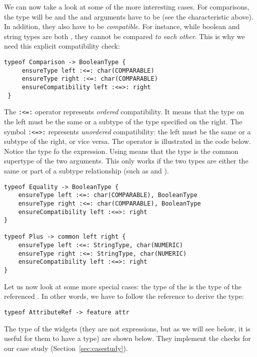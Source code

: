 We can now take a look at some of the more interesting cases. For comparisons,
the type will be  and the  and  arguments
have to be  (see the characteristic above). In addition, they
also have to be \emph{compatible}. For instance, while boolean and string types are
both , they cannot be compared \emph{to each other}. This is why
we need this explicit compatibility check:

\begin{lstlisting}[language=xts]
 typeof Comparison -> BooleanType {
     ensureType left :<=: char(COMPARABLE)
     ensureType right :<=: char(COMPARABLE)
     ensureCompatibility left :<=>: right
 } 
\end{lstlisting}


The \verb|:<=:| operator represents \emph{ordered} compatibility. It means that
the type on the left must be the same or a subtype of the type specified on the
right. The symbol \verb|:<=>:| represents \emph{unordered} compatibility: the
left must be the same or a subtype of the right, or vice versa. The operator is
illustrated in the code below. Notice the type fo the  expression.
Using  means that the type is the common supertype of the two
arguments. This only works if the two types are either the same or part of a
subtype relationship (such as  and ).


\begin{lstlisting}[language=xts,float,label=lst:xts-binaryexpressions] 
typeof Equality -> BooleanType {
    ensureType left :<=: char(COMPARABLE), BooleanType
    ensureType right :<=: char(COMPARABLE), BooleanType
    ensureCompatibility left :<=>: right
}

typeof Plus -> common left right {
    ensureType left :<=: StringType, char(NUMERIC)
    ensureType right :<=: StringType, char(NUMERIC)
    ensureCompatibility left :<=>: right
} 
\end{lstlisting}


Let us now look at some more special cases: the type of the 
is the type of the referenced . In other words, we have to follow the 
 reference to derive the type:

\begin{lstlisting}[language=xts]
typeof AttributeRef -> feature attr
\end{lstlisting}

The type of the widgets (they are not expressions, but as we will see below, it
is useful for them to have a type) are shown below. They implement the checks
for our case study (Section~\ref{sec:casestudy}).

